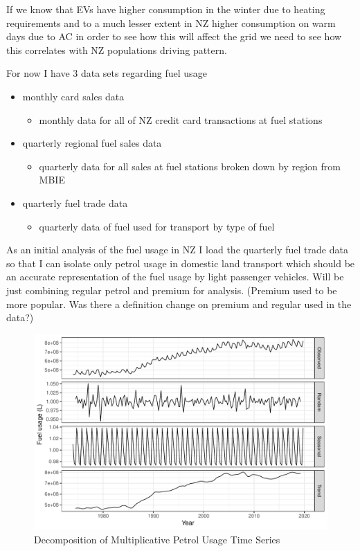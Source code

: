 \documentclass[
]{article}
\begin{document}
If we know that EVs have higher consumption in the winter due to heating
requirements and to a much lesser extent in NZ higher consumption on
warm days due to AC in order to see how this will affect the grid we
need to see how this correlates with NZ populations driving pattern.

For now I have 3 data sets regarding fuel usage

\begin{itemize}
  \item monthly card sales data 
  \begin{itemize}
    \item monthly data for all of NZ credit card transactions at fuel stations
  \end{itemize}
  \item quarterly regional fuel sales data
  \begin{itemize}
    \item quarterly data for all sales at fuel stations broken down by region from MBIE
  \end{itemize}
  \item quarterly fuel trade data
    \begin{itemize}
    \item quarterly data of fuel used for transport by type of fuel
  \end{itemize}
\end{itemize}

As an initial analysis of the fuel usage in NZ I load the quarterly fuel
trade data so that I can isolate only petrol usage in domestic land
transport which should be an accurate representation of the fuel usage
by light passenger vehicles. Will be just combining regular petrol and
premium for analysis. (Premium used to be more popular. Was there a
definition change on premium and regular used in the data?)

\begin{figure}
\centering
\includegraphics{summary_week4_files/figure-latex/petrol_ts-1.pdf}
\caption{Decomposition of Multiplicative Petrol Usage Time Series}
\end{figure}
\end{document}
